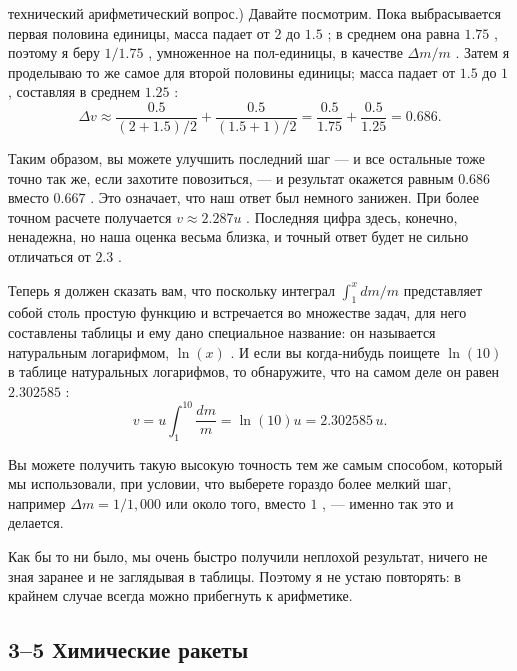 \documentclass[11pt,oneside]{article}
\begin{document}
технический арифметический вопрос.) Давайте посмотрим. Пока выбрасывается первая половина единицы, масса падает от \(2\) до \(1.5\) ; в среднем она равна \(1.75\) , поэтому я беру \(1/1.75\) , умноженное на пол-единицы, в качестве \(\Delta m/m\) . Затем я проделываю то же самое для второй половины единицы; масса падает от \(1.5\) до \(1\) , составляя в среднем \(1.25\) : 
\begin{equation*} \Delta v \approx \frac{0.5}{(2+1.5)/2} + \frac{0.5}{(1.5+1)/2} = \frac{0.5}{1.75} + \frac{0.5}{1.25} = 0.686. \end{equation*}
\par

Таким образом, вы можете улучшить последний шаг --- и все остальные тоже точно так же, если захотите повозиться, --- и результат окажется равным \(0.686\) вместо \(0.667\) . Это означает, что наш ответ был немного занижен. При более точном расчете получается \(v \approx 2.287u\) . Последняя цифра здесь, конечно, ненадежна, но наша оценка весьма близка, и точный ответ будет не сильно отличаться от \(2.3\) .\par

Теперь я должен сказать вам, что поскольку интеграл \(\int_1^x dm/m\) представляет собой столь простую функцию и встречается во множестве задач, для него составлены таблицы и ему дано специальное название: он называется натуральным логарифмом, \(\ln(x)\) . И если вы когда-нибудь поищете \(\ln(10)\) в таблице натуральных логарифмов, то обнаружите, что на самом деле он равен \(2.302585\) : 
\begin{equation*} \tag{3.19}
\label{Eq:TIPS:3:19} v = u \int_1^{10} \frac{dm}{m} = \ln(10)u = 2.302585\,u. \end{equation*}
\par

Вы можете получить такую высокую точность тем же самым способом, который мы использовали, при условии, что выберете гораздо более мелкий шаг, например \(\Delta m = 1/1,\!000\) или около того, вместо \(1\) , --- именно так это и делается.\par

Как бы то ни было, мы очень быстро получили неплохой результат, ничего не зная заранее и не заглядывая в таблицы. Поэтому я не устаю повторять: в крайнем случае всегда можно прибегнуть к арифметике.\par

\subsection*{3--5 Химические ракеты}
\end{document}
